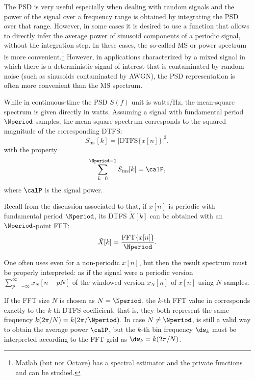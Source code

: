 The PSD is very useful especially when dealing with random signals and the power of the signal over a frequency range is obtained by integrating the PSD over that range. 
However, in some cases it is desired to use a function that allows to directly infer the average power of sinusoid components of a periodic signal, without the integration step. In these cases, the so-called MS or power spectrum is more convenient.\footnote{Matlab (but not Octave) has a  spectral estimator and the private functions  and  can be studied.} 
However, in applications characterized by a mixed signal in which there is a deterministic signal of interest that is contaminated by random noise (such as sinusoids contaminated by AWGN), the PSD representation is often more convenient than the MS spectrum.

While in continuous-time the PSD $S(f)$ unit is watts/Hz, the mean-square spectrum is given directly in watts. Assuming a signal with fundamental period $\Nperiod$ samples, the mean-square spectrum corresponds to the squared magnitude of the corresponding DTFS:
\begin{equation}
S_{\textrm{ms}}[k] = |\textrm{DTFS}\{x[n]\}|^2,
\label{eq:msspectrumDef}
\end{equation}
with the property
\begin{equation}
\sum_{k=0}^{\Nperiod-1} S_{\textrm{ms}}[k] = \calP,
\label{eq:periodic_ms_sumPower}
\end{equation}
where $\calP$ is the signal power. %

Recall from the discussion associated to  that, if $x[n]$ is periodic with fundamental period $\Nperiod$, its DTFS $\tilde X[k]$ can be obtained with an $\Nperiod$-point FFT:
\begin{equation}
\tilde X[k] = \frac{\textrm{FFT}\{x[n]\}}{\Nperiod}.
\label{eq:msspectrumViaFFT}
\end{equation}

One often uses  even for a non-periodic $x[n]$, but then the result spectrum must be properly interpreted: as if the signal were a periodic version $\sum_{p=-\infty}^{\infty}x_N[n-pN]$ of the windowed version $x_N[n]$ of $x[n]$ using
$N$ samples. 

If the FFT size $N$ is chosen as $N=\Nperiod$, the $k$-th FFT value in  corresponds exactly to the $k$-th DTFS coefficient, that is, they both represent the same frequency $k (2 \pi / N) = k (2 \pi / \Nperiod)$. In case $N \ne \Nperiod$,  is still a valid way to obtain the average power $\calP$, but the $k$-th bin frequency $\dw_k$ must be interpreted according to the FFT grid as $\dw_k = k (2 \pi / N)$.

